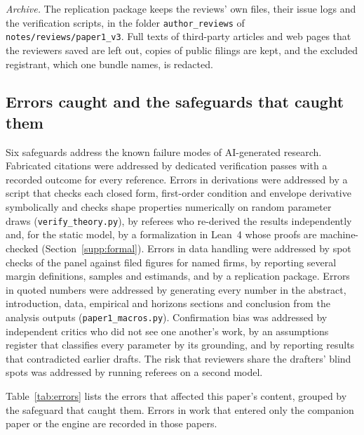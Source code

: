 \emph{Archive.} The replication package keeps the reviews' own files, their issue logs and the verification scripts, in the folder \texttt{author\_reviews} of \texttt{notes/reviews/paper1\_v3}. Full texts of third-party articles and web pages that the reviewers saved are left out, copies of public filings are kept, and the excluded registrant, which one bundle names, is redacted.

\subsection{Errors caught and the safeguards that caught them}
Six safeguards address the known failure modes of AI-generated research. Fabricated citations were addressed by dedicated verification passes with a recorded outcome for every reference. Errors in derivations were addressed by a script that checks each closed form, first-order condition and envelope derivative symbolically and checks shape properties numerically on random parameter draws (\texttt{verify\_theory.py}), by referees who re-derived the results independently and, for the static model, by a formalization in Lean~4 whose proofs are machine-checked (Section~\ref{supp:formal}). Errors in data handling were addressed by spot checks of the panel against filed figures for named firms, by reporting several margin definitions, samples and estimands, and by a replication package. Errors in quoted numbers were addressed by generating every number in the abstract, introduction, data, empirical and horizons sections and conclusion from the analysis outputs (\texttt{paper1\_macros.py}). Confirmation bias was addressed by independent critics who did not see one another's work, by an assumptions register that classifies every parameter by its grounding, and by reporting results that contradicted earlier drafts. The risk that reviewers share the drafters' blind spots was addressed by running referees on a second model.

Table~\ref{tab:errors} lists the errors that affected this paper's content, grouped by the safeguard that caught them. Errors in work that entered only the companion paper or the engine are recorded in those papers.

